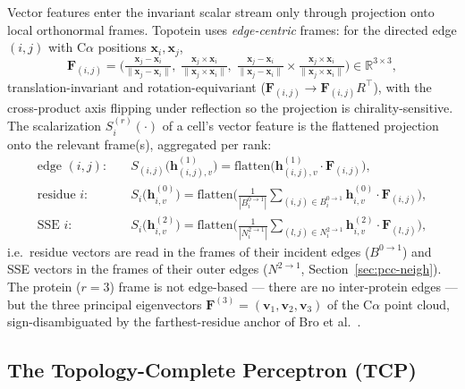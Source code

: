 \documentclass[11pt,a4paper]{article}
\theoremstyle{definition}
\begin{document}
Vector features enter the invariant scalar stream only through projection onto local
orthonormal frames. Topotein uses \emph{edge-centric} frames: for the directed edge
$(i,j)$ with C$\alpha$ positions $\mathbf{x}_i,\mathbf{x}_j$,
\[
\mathbf{F}_{(i,j)}=\Big(\tfrac{\mathbf{x}_j-\mathbf{x}_i}{\lVert\mathbf{x}_j-\mathbf{x}_i\rVert},\;
\tfrac{\mathbf{x}_j\times\mathbf{x}_i}{\lVert\mathbf{x}_j\times\mathbf{x}_i\rVert},\;
\tfrac{\mathbf{x}_j-\mathbf{x}_i}{\lVert\mathbf{x}_j-\mathbf{x}_i\rVert}\times\tfrac{\mathbf{x}_j\times\mathbf{x}_i}{\lVert\mathbf{x}_j\times\mathbf{x}_i\rVert}\Big)\in\mathbb{R}^{3\times 3},
\]
translation-invariant and rotation-equivariant ($\mathbf{F}_{(i,j)}\to\mathbf{F}_{(i,j)}R^{\top}$),
with the cross-product axis flipping under reflection so the projection is
chirality-sensitive. The scalarization $S^{(r)}_i(\cdot)$ of a cell's vector feature
is the flattened projection onto the relevant frame(s), aggregated per rank:
\[
\begin{aligned}
\text{edge }(i,j):\quad & S_{(i,j)}\big(\mathbf{h}^{(1)}_{(i,j),v}\big)=\mathrm{flatten}\big(\mathbf{h}^{(1)}_{(i,j),v}\cdot\mathbf{F}_{(i,j)}\big),\\[2pt]
\text{residue }i:\quad & S_i\big(\mathbf{h}^{(0)}_{i,v}\big)=\mathrm{flatten}\Big(\tfrac{1}{|B^{0\to1}_i|}\!\!\sum_{(i,j)\in B^{0\to1}_i}\!\!\mathbf{h}^{(0)}_{i,v}\cdot\mathbf{F}_{(i,j)}\Big),\\[2pt]
\text{SSE }i:\quad & S_i\big(\mathbf{h}^{(2)}_{i,v}\big)=\mathrm{flatten}\Big(\tfrac{1}{|N^{2\to1}_i|}\!\!\sum_{(l,j)\in N^{2\to1}_i}\!\!\mathbf{h}^{(2)}_{i,v}\cdot\mathbf{F}_{(l,j)}\Big),
\end{aligned}
\]
i.e.\ residue vectors are read in the frames of their incident edges ($B^{0\to1}$)
and SSE vectors in the frames of their outer edges ($N^{2\to1}$,
Section~\ref{sec:pcc-neigh}). The protein ($r=3$) frame is not edge-based --- there
are no inter-protein edges --- but the three principal eigenvectors
$\mathbf{F}^{(3)}=(\mathbf{v}_1,\mathbf{v}_2,\mathbf{v}_3)$ of the C$\alpha$ point
cloud, sign-disambiguated by the farthest-residue anchor of Bro et al.~\cite{bro2008}.

\subsection{The Topology-Complete Perceptron (TCP)}
\label{sec:tcp}
\end{document}
